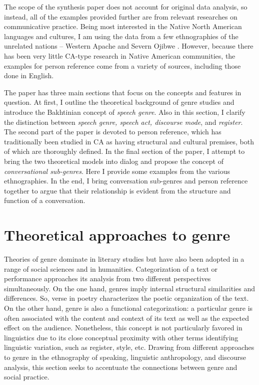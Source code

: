 \documentclass[12pt]{article}
\begin{document}
The scope of the synthesis paper does not account for original data analysis, so instead, all of the examples provided further are from relevant researches on communicative practice. Being most interested in the Native North American languages and cultures, I am using the data from a few ethnographies of the unrelated nations -- Western Apache \parencite{basso1996, basso1990, samuels2004} and Severn Ojibwe \parencite{valentine1995}. However, because there has been very little CA-type research in Native American communities, the examples for person reference come from a variety of sources, including those done in English. 

The paper has three main sections that focus on the concepts and features in question. At first, I  outline the theoretical background of genre studies and introduce the Bakhtinian concept of \textit{speech genre}. Also in this section, I  clarify the distinction between \textit{speech genre, speech act, discourse mode}, and \textit{register}. The second part of the paper is devoted to person reference, which has traditionally been studied in CA as having structural and cultural premises, both of which are thoroughly defined. In the final section of the paper, I attempt to bring the two theoretical models into dialog and propose the concept of \textit{conversational sub-genres}. Here I provide some examples from the various ethnographies. In the end, I bring conversation sub-genres and person reference together to argue that their relationship is evident from the structure and function of a conversation.
\section{Theoretical approaches to genre}
Theories of genre dominate in literary studies but have also been adopted in a range of social sciences and in humanities. Categorization of a text or performance approaches its analysis from two different perspectives simultaneously. On the one hand, genres imply internal structural similarities and differences. So, verse in poetry characterizes the poetic organization of the text. On the other hand, genre is also a functional categorization: a particular genre is often associated with the content and context of its text as well as the expected effect on the audience. Nonetheless, this concept is not particularly favored in linguistics due to its close conceptual proximity with other terms identifying linguistic variation, such as register, style, etc. Drawing from different approaches to genre in the ethnography of speaking, linguistic anthropology, and discourse analysis, this section seeks to accentuate the connections between genre and social practice.
\end{document}
